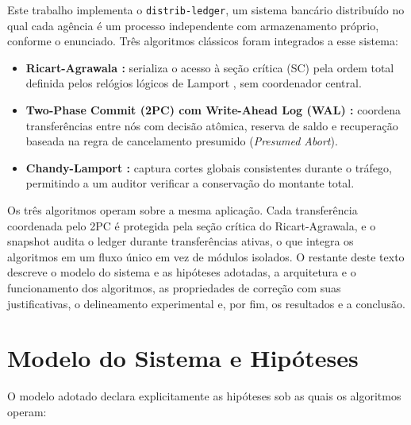 \documentclass[conference]{IEEEtran}
\begin{document}
Este trabalho implementa o \texttt{distrib-ledger}, um sistema bancário
distribuído no qual cada agência é um processo independente com armazenamento
próprio, conforme o enunciado. Três algoritmos clássicos foram integrados a
esse sistema:

\begin{itemize}
    \item \textbf{Ricart-Agrawala \cite{ricart1981algorithm}:} serializa o
    acesso à seção crítica (SC) pela ordem total definida pelos relógios
    lógicos de Lamport \cite{lamport1978time}, sem coordenador central.
    \item \textbf{Two-Phase Commit (2PC) com Write-Ahead Log (WAL) \cite{gray1978notes}:}
    coordena transferências entre nós com decisão atômica, reserva de saldo e
    recuperação baseada na regra de cancelamento presumido
    (\emph{Presumed Abort}).
    \item \textbf{Chandy-Lamport \cite{chandy1985distributed}:} captura cortes
    globais consistentes durante o tráfego, permitindo a um auditor verificar a
    conservação do montante total.
\end{itemize}

Os três algoritmos operam sobre a mesma aplicação. Cada transferência
coordenada pelo 2PC é protegida pela seção crítica do Ricart-Agrawala, e o
snapshot audita o ledger durante transferências ativas, o que integra os
algoritmos em um fluxo único em vez de módulos isolados. O restante deste
texto descreve o modelo do sistema e as hipóteses adotadas, a arquitetura e o
funcionamento dos algoritmos, as propriedades de correção com suas
justificativas, o delineamento experimental e, por fim, os resultados e a
conclusão.

\section{Modelo do Sistema e Hipóteses}
O modelo adotado declara explicitamente as hipóteses sob as quais os
algoritmos operam:
\end{document}
